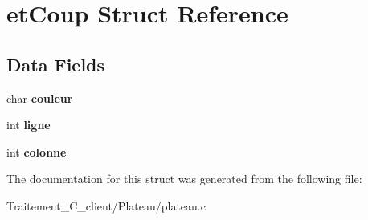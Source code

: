 \hypertarget{structet_coup}{}\section{et\+Coup Struct Reference}
\label{structet_coup}
\subsection*{Data Fields}
\begin{DoxyCompactItemize}
\item 
char {\bfseries couleur}\hypertarget{structet_coup_a7d939a822f708b17b81e028a43f4594e}{}\label{structet_coup_a7d939a822f708b17b81e028a43f4594e}

\item 
int {\bfseries ligne}\hypertarget{structet_coup_a66af32d3d7b5e0efd6db373c0813e7dd}{}\label{structet_coup_a66af32d3d7b5e0efd6db373c0813e7dd}

\item 
int {\bfseries colonne}\hypertarget{structet_coup_a733a251be89c7decb13f4fb7b413c82d}{}\label{structet_coup_a733a251be89c7decb13f4fb7b413c82d}

\end{DoxyCompactItemize}


The documentation for this struct was generated from the following file\+:\begin{DoxyCompactItemize}
\item 
Traitement\+\_\+\+C\+\_\+client/\+Plateau/plateau.\+c\end{DoxyCompactItemize}
